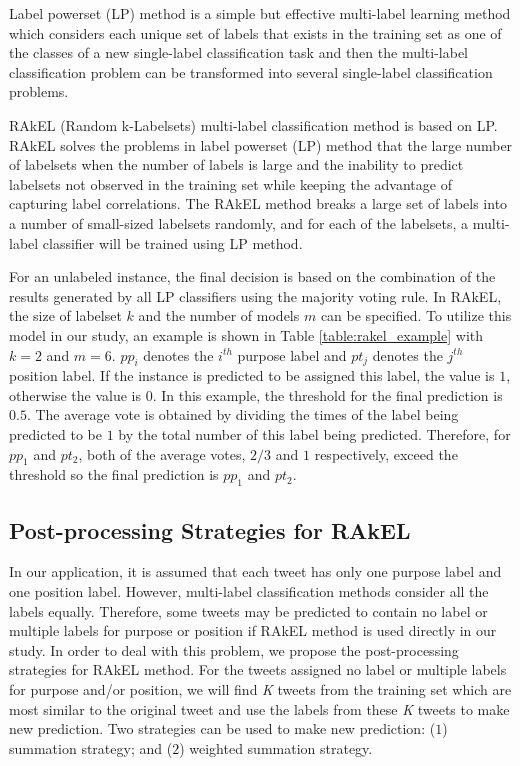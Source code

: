 \documentclass[letterpaper]{article}
\begin{document}
Label powerset (LP) method \cite{boutell2004learning} is a simple but effective multi-label learning method which considers each unique set of labels that exists in the training set as one of the classes of a new single-label classification task and then the multi-label classification problem can be transformed into several single-label classification problems. 

RAkEL (Random k-Labelsets) multi-label classification method \cite{tsoumakas2010random} is based on LP. RAkEL solves the problems in label powerset (LP) method \cite{boutell2004learning} that the large number of labelsets when the number of labels is large and the inability to predict labelsets not observed in the training set while keeping the advantage of capturing label correlations. The RAkEL method breaks a large set of labels into a number of small-sized labelsets randomly, and for each of the labelsets, a multi-label classifier will be trained using LP method. 

For an unlabeled instance, the final decision is based on the combination of the results generated by all LP classifiers using the majority voting rule. In RAkEL, the size of labelset $k$ and the number of models $m$ can be specified. To utilize this model in our study, an example is shown in Table \ref{table:rakel_example} with $k = 2$ and $m = 6$. $pp_i$ denotes the $i^{th}$ purpose label and $pt_j$ denotes the $j^{th}$ position label. If the instance is predicted to be assigned this label, the value is $1$, otherwise the value is $0$. In this example, the threshold for the final prediction is $0.5$. The average vote is obtained by dividing the times of the label being predicted to be $1$ by the total number of this label being predicted. Therefore, for $pp_1$ and $pt_2$, both of the average votes, $2/3$ and $1$ respectively, exceed the threshold so the final prediction is $pp_1$ and $pt_2$.

\subsection{Post-processing Strategies for RAkEL}
\label{subsec:postprocessing}
In our application, it is assumed that each tweet has only one purpose label and one position label. However, multi-label classification methods consider all the labels equally. Therefore, some tweets may be predicted to contain no label or multiple labels for purpose or position if RAkEL method is used directly in our study. In order to deal with this problem, we propose the post-processing strategies for RAkEL method. For the tweets assigned no label or multiple labels for purpose and/or position, we will find \textit{K} tweets from the training set which are most similar to the original tweet and use the labels from these \textit{K} tweets to make new prediction. Two strategies can be used to make new prediction: ($1$) summation strategy; and ($2$) weighted summation strategy.
\end{document}
